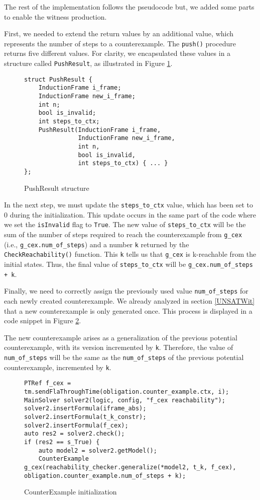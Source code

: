 The rest of the implementation follows the pseudocode but, we added some parts to enable the witness production. 

First, we needed to extend the return values by an additional value, which represents the number of steps to a counterexample. The \texttt{push()} procedure returns five different values. For clarity, we encapsulated these values in a structure called \texttt{PushResult}, as illustrated in Figure \ref{code:PushResult}.

\begin{figure}[H]
\begin{lstlisting}
struct PushResult {
    InductionFrame i_frame;
    InductionFrame new_i_frame;
    int n;
    bool is_invalid;
    int steps_to_ctx;
    PushResult(InductionFrame i_frame,
               InductionFrame new_i_frame,
               int n,
               bool is_invalid,
               int steps_to_ctx) { ... }
};
\end{lstlisting}
\caption{PushResult structure}\label{code:PushResult}
\end{figure}

In the next step, we must update the \texttt{steps\_to\_ctx} value, which has been set to 0 during the initialization. This update occurs in the same part of the code where we set the \texttt{isInvalid} flag to \texttt{True}. The new value of \texttt{steps\_to\_ctx} will be the sum of the number of steps required to reach the counterexample from \texttt{g\_cex} (i.e., \texttt{g\_cex.num\_of\_steps}) and a number \texttt{k} returned by the \texttt{CheckReachability()} function. This \texttt{k} tells us that \texttt{g\_cex} is k-reachable from the initial states. Thus, the final value of \texttt{steps\_to\_ctx} will be \texttt{g\_cex.num\_of\_steps + k}.

Finally, we need to correctly assign the previously used value \texttt{num\_of\_steps} for each newly created counterexample. We already analyzed in section \ref{UNSATWit} that a new counterexample is only generated once. This process is displayed in a code snippet in Figure \ref{code:CEX}. 

The new counterexample arises as a generalization of the previous potential counterexample, with its version incremented by \texttt{k}.  Therefore, the value of \texttt{num\_of\_steps} will be the same as the \texttt{num\_of\_steps} of the previous potential counterexample, incremented by \texttt{k}.

\begin{figure}[H]
\begin{lstlisting}
PTRef f_cex = tm.sendFlaThroughTime(obligation.counter_example.ctx, i);
MainSolver solver2(logic, config, "f_cex reachability");
solver2.insertFormula(iframe_abs);
solver2.insertFormula(t_k_constr);
solver2.insertFormula(f_cex);
auto res2 = solver2.check();
if (res2 == s_True) {
    auto model2 = solver2.getModel();
    CounterExample g_cex(reachability_checker.generalize(*model2, t_k, f_cex), obligation.counter_example.num_of_steps + k);
\end{lstlisting}
\caption{CounterExample initialization}\label{code:CEX}
\end{figure}



